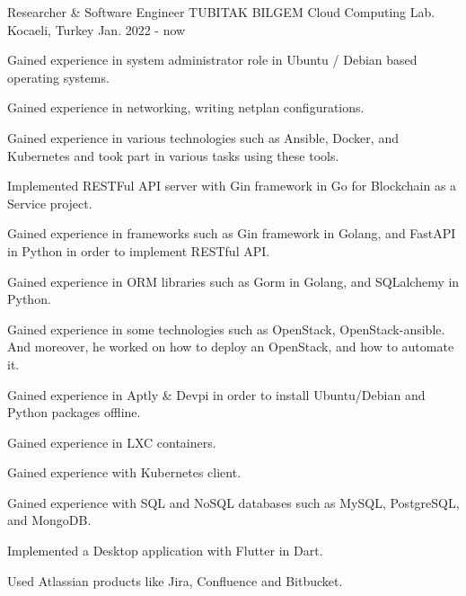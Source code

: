 

\begin{cventries}

  \cventry
    {Researcher \& Software Engineer} %
    {TUBITAK BILGEM Cloud Computing Lab.} %
    {Kocaeli, Turkey} %
    {Jan. 2022 - now} %
    {
      \begin{cvitems} %
        \item {Gained experience in system administrator role in Ubuntu / Debian based operating systems.}
        \item {Gained experience in networking, writing netplan configurations.}
        \item {Gained experience in various technologies such as Ansible, Docker, and Kubernetes and took part in various tasks using these tools.}
        \item {Implemented RESTFul API server with Gin framework in Go for Blockchain as a Service project.}
        \item {Gained experience in frameworks such as Gin framework in Golang, and FastAPI in Python in order to implement RESTful API.}
        \item {Gained experience in ORM libraries such as Gorm in Golang, and SQLalchemy in Python.}
        \item {Gained experience in some technologies such as OpenStack, OpenStack-ansible. And moreover, he worked on how to deploy an OpenStack, and how to automate it.}
        \item {Gained experience in Aptly \& Devpi in order to install Ubuntu/Debian and Python packages offline.}
        \item {Gained experience in LXC containers.}
        \item {Gained experience with Kubernetes client.}
        \item {Gained experience with SQL and NoSQL databases such as MySQL, PostgreSQL, and MongoDB.}
        \item {Implemented a Desktop application with Flutter in Dart.}
        \item {Used Atlassian products like Jira, Confluence and Bitbucket.}
      \end{cvitems}
    }


\end{cventries}
